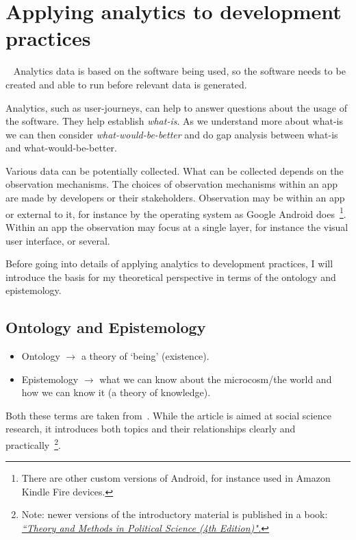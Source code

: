 \chapter{Applying analytics to development practices}~\label{chapter-applying-analytics-to-development-practices}
Analytics data is based on the software being used, so the software needs to be created and able to run before relevant data is generated.

Analytics, such as user-journeys, can help to answer questions about the usage of the software. They help establish \emph{what-is}. As we understand more about what-is we can then consider \emph{what-would-be-better} and do gap analysis between what-is and what-would-be-better.

Various data can be potentially collected. What can be collected depends on the observation mechanisms. The choices of observation mechanisms within an app are made by developers or their stakeholders. Observation may be within an app or external to it, for instance by the operating system as Google Android does~\footnote{There are other custom versions of Android, for instance used in Amazon Kindle Fire devices.}. Within an app the observation may focus at a single layer, for instance the visual user interface, or several.

Before going into details of applying analytics to development practices, I will introduce the basis for my theoretical perspective in terms of the ontology and epistemology.

\section{Ontology and Epistemology}
\begin{itemize}
    \item Ontology \( \rightarrow \) a theory of `being' (existence).
    \item Epistemology \( \rightarrow \) what we can know about the microcosm/the world and how we can know it (a theory of knowledge).
\end{itemize}

Both these terms are taken from~\cite{marsh2002skin}. While the article is aimed at social science research, it introduces both topics and their relationships clearly and practically~\footnote{Note: newer versions of the introductory material is published in a book: \href{https://www.macmillanihe.com/page/detail/Theory-and-Methods-in-Political-Science/?K=9781137603517}{\emph{``Theory and Methods in Political Science (4th Edition)".}}}. 

